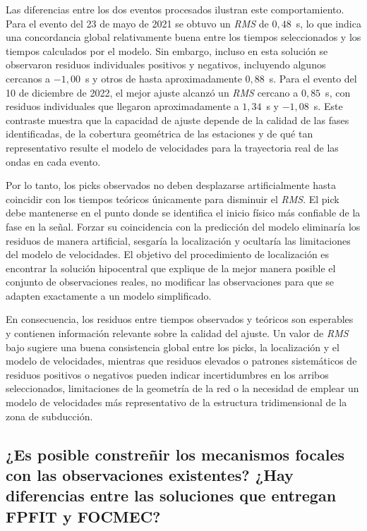\documentclass[a4paper,12pt]{article} %
\numberwithin{equation}{section} %
\numberwithin{figure}{section} %
\begin{document}
Las diferencias entre los dos eventos procesados ilustran este comportamiento. Para el evento del 23 de mayo de 2021 se obtuvo un \textit{RMS} de $0{,}48$~s, lo que indica una concordancia global relativamente buena entre los tiempos seleccionados y los tiempos calculados por el modelo. Sin embargo, incluso en esta solución se observaron residuos individuales positivos y negativos, incluyendo algunos cercanos a $-1{,}00$~s y otros de hasta aproximadamente $0{,}88$~s. Para el evento del 10 de diciembre de 2022, el mejor ajuste alcanzó un \textit{RMS} cercano a $0{,}85$~s, con residuos individuales que llegaron aproximadamente a $1{,}34$~s y $-1{,}08$~s. Este contraste muestra que la capacidad de ajuste depende de la calidad de las fases identificadas, de la cobertura geométrica de las estaciones y de qué tan representativo resulte el modelo de velocidades para la trayectoria real de las ondas en cada evento.

Por lo tanto, los picks observados no deben desplazarse artificialmente hasta coincidir con los tiempos teóricos únicamente para disminuir el \textit{RMS}. El pick debe mantenerse en el punto donde se identifica el inicio físico más confiable de la fase en la señal. Forzar su coincidencia con la predicción del modelo eliminaría los residuos de manera artificial, sesgaría la localización y ocultaría las limitaciones del modelo de velocidades. El objetivo del procedimiento de localización es encontrar la solución hipocentral que explique de la mejor manera posible el conjunto de observaciones reales, no modificar las observaciones para que se adapten exactamente a un modelo simplificado.

En consecuencia, los residuos entre tiempos observados y teóricos son esperables y contienen información relevante sobre la calidad del ajuste. Un valor de \textit{RMS} bajo sugiere una buena consistencia global entre los picks, la localización y el modelo de velocidades, mientras que residuos elevados o patrones sistemáticos de residuos positivos o negativos pueden indicar incertidumbres en los arribos seleccionados, limitaciones de la geometría de la red o la necesidad de emplear un modelo de velocidades más representativo de la estructura tridimensional de la zona de subducción.


\subsection{¿Es posible constreñir los mecanismos focales con las observaciones existentes? ¿Hay diferencias entre las soluciones que entregan FPFIT y FOCMEC?}
\end{document}
